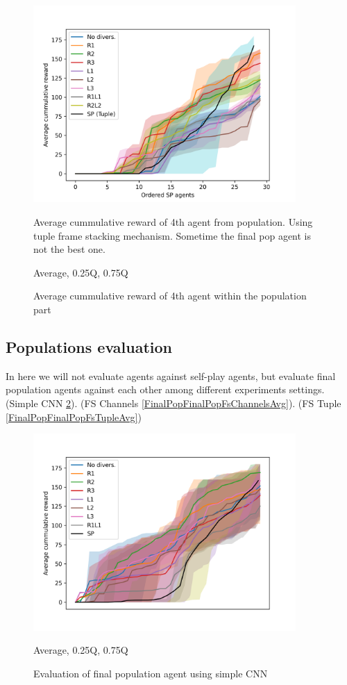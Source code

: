 \begin{figure}[!ht]
    \centering
    \includegraphics*[width=10cm]{../img/FSTuple4thOrderedAvg.png}

    \caption{Average cummulative reward of 4th agent within the population part}
    \label{FSTuple4thOrderedAvg}
    \medskip
    \small 
    Average cummulative reward of 4th agent from population.
    Using tuple frame stacking mechanism.
    Sometime the final pop agent is not the best one.

    Average, 0.25Q, 0.75Q

\end{figure}


\subsection{Populations evaluation}
In here we will not evaluate agents against self-play agents, but evaluate final population agents against each other among different experiments settings.
(Simple CNN \ref{FinalPopFinalPopSimpleCnnAvg}). (FS Channels \ref{FinalPopFinalPopFsChannelsAvg}). (FS Tuple \ref{FinalPopFinalPopFsTupleAvg})
\begin{figure}[!ht]
    \centering
    \includegraphics*[width=10cm]{../img/FinalPopFinalPopSimpleCnnAvg.png}

    \caption{Evaluation of final population agent using simple CNN}
    \label{FinalPopFinalPopSimpleCnnAvg}
    \medskip
    \small 

    Average, 0.25Q, 0.75Q

\end{figure}

